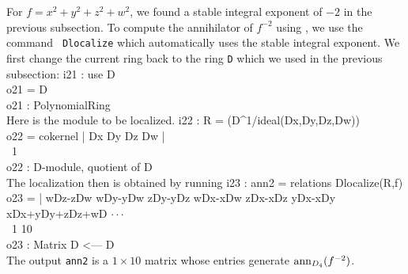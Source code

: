 \begin{example}
For $f=x^2+y^2+z^2+w^2$, we found a stable integral exponent of $-2$
in the previous subsection.
To compute the annihilator of 
$f^{-2}$ using \Mtwo, we use the command {\tt
Dlocalize} which automatically uses the stable integral exponent.
We first change the current ring back to the ring {\tt D} which we used 
in the previous subsection:
\beginOutput
i21 : use D\\
\emptyLine
o21 = D\\
\emptyLine
o21 : PolynomialRing\\
\endOutput
Here is the
module to be localized.
\beginOutput
i22 : R = (D^1/ideal(Dx,Dy,Dz,Dw))\\
\emptyLine
o22 = cokernel | Dx Dy Dz Dw |\\
\emptyLine
\                             1\\
o22 : D-module, quotient of D\\
\endOutput
The localization then is obtained by running
\beginOutput
i23 : ann2 = relations Dlocalize(R,f)\\
\emptyLine
o23 = | wDz-zDw wDy-yDw zDy-yDz wDx-xDw zDx-xDz yDx-xDy xDx+yDy+zDz+wD $\cdot\cdot\cdot$\\
\emptyLine
\              1       10\\
o23 : Matrix D  <--- D\\
\endOutput
The output {\tt ann2} is a $1\times 10$ matrix whose entries generate
$\operatorname{ann}_{D_4}(f^{-2})$. 
\end{example}

